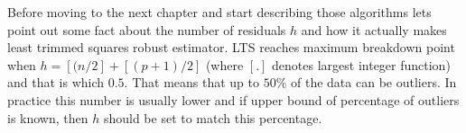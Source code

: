 Before moving to the next chapter and start describing those algorithms lets point out some fact about the number of residuals $h$ and how it actually makes least trimmed squares robust estimator.
LTS reaches maximum breakdown point when $h = [(n/2] + [(p+1)/2]$ (where $[.]$ denotes largest integer function) and that is  which $0.5$. That means that up to $50\%$ of the data can be outliers. In practice this number is usually lower and if upper bound of percentage of outliers is known, then $h$ should be set to match this percentage.




